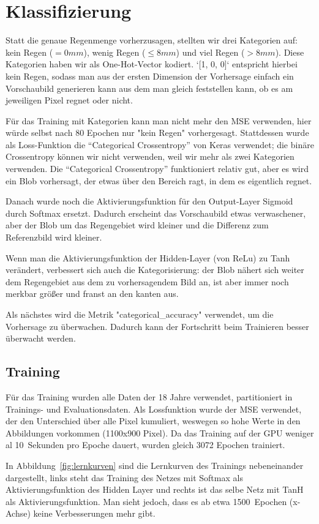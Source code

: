 \section{Klassifizierung}
Statt die genaue Regenmenge vorherzusagen, stellten wir drei Kategorien auf: kein Regen ($= 0mm$), wenig Regen ($\leq 8mm$) und viel Regen ($> 8mm$). Diese Kategorien haben wir als One-Hot-Vector kodiert. `[1, 0, 0]` entspricht hierbei kein Regen, sodass man aus der ersten Dimension der Vorhersage einfach ein Vorschaubild generieren kann aus dem man gleich feststellen kann, ob es am jeweiligen Pixel regnet oder nicht.

Für das Training mit Kategorien kann man nicht mehr den MSE verwenden, hier würde selbst nach 80 Epochen nur "kein Regen" vorhergesagt. Stattdessen wurde als Loss-Funktion die \enquote{Categorical Crossentropy} von Keras verwendet; die binäre Crossentropy können wir nicht verwenden, weil wir mehr als zwei Kategorien verwenden. Die \enquote{Categorical Crossentropy} funktioniert relativ gut, aber es wird ein Blob vorhersagt, der etwas über den Bereich ragt, in dem es eigentlich regnet.

Danach wurde noch die Aktivierungsfunktion für den Output-Layer Sigmoid durch Softmax ersetzt. Dadurch erscheint das Vorschaubild etwas verwaschener, aber der Blob um das Regengebiet wird kleiner und die Differenz zum Referenzbild wird kleiner.

Wenn man die Aktivierungsfunktion der Hidden-Layer (von ReLu) zu Tanh verändert, verbessert sich auch die Kategorisierung: der Blob nähert sich weiter dem Regengebiet aus dem zu vorhersagendem Bild an, ist aber immer noch merkbar größer und franst an den kanten aus.

Als nächstes wird die Metrik "categorical\_accuracy" verwendet, um die Vorhersage zu überwachen. Dadurch kann der Fortschritt beim Trainieren besser überwacht werden.


\subsection{Training}
Für das Training wurden alle Daten der 18 Jahre verwendet, partitioniert in Trainings- und Evaluationsdaten. Als Lossfunktion wurde der MSE verwendet, der den Unterschied über alle Pixel kumuliert, weswegen so hohe Werte in den Abbildungen vorkommen (1100x900 Pixel). Da das Training auf der GPU weniger al 10~Sekunden pro Epoche dauert, wurden gleich 3072 Epochen trainiert.

In Abbildung~\ref{fig:lernkurven} sind die Lernkurven des Trainings nebeneinander dargestellt, links steht das Training des Netzes mit Softmax als Aktivierungsfunktion des Hidden Layer und rechts ist das selbe Netz mit TanH als Aktivierungsfunktion. Man sieht jedoch, dass es ab etwa 1500~Epochen (x-Achse) keine Verbesserungen mehr gibt.

